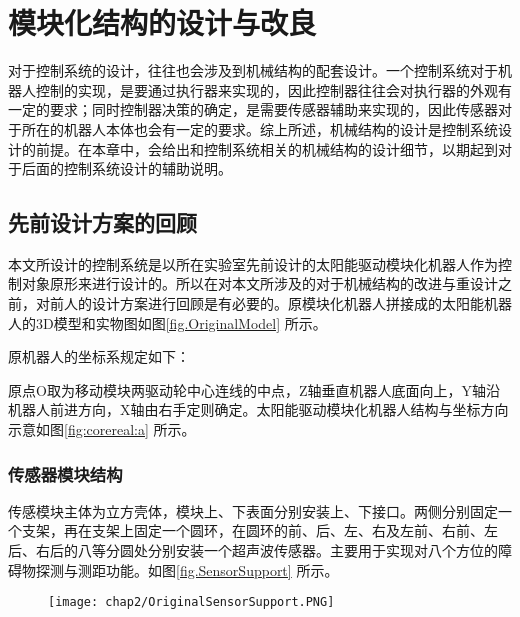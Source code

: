 
\chapter{模块化结构的设计与改良}
\label{chap:mechanicalSystem}
对于控制系统的设计，往往也会涉及到机械结构的配套设计。一个控制系统对于机器人控制的实现，是要通过执行器来实现的，因此控制器往往会对执行器的外观有一定的要求；同时控制器决策的确定，是需要传感器辅助来实现的，因此传感器对于所在的机器人本体也会有一定的要求。综上所述，机械结构的设计是控制系统设计的前提。在本章中，会给出和控制系统相关的机械结构的设计细节，以期起到对于后面的控制系统设计的辅助说明。

\section{先前设计方案的回顾}
本文所设计的控制系统是以所在实验室先前设计的太阳能驱动模块化机器人作为控制对象原形来进行设计的。所以在对本文所涉及的对于机械结构的改进与重设计之前，对前人的设计方案进行回顾是有必要的。原模块化机器人拼接成的太阳能机器人的3D模型和实物图如图\ref{fig.OriginalModel} 所示。 \\
\begin{figure}
  \centering
  \hspace{1in}
\end{figure}
原机器人的坐标系规定如下：

原点O取为移动模块两驱动轮中心连线的中点，Z轴垂直机器人底面向上，Y轴沿机器人前进方向，X轴由右手定则确定。太阳能驱动模块化机器人结构与坐标方向示意如图\ref{fig:corereal:a} 所示。
\subsection{传感器模块结构}
传感模块主体为立方壳体，模块上、下表面分别安装上、下接口。两侧分别固定一个支架，再在支架上固定一个圆环，在圆环的前、后、左、右及左前、右前、左后、右后的八等分圆处分别安装一个超声波传感器。主要用于实现对八个方位的障碍物探测与测距功能。如图\ref{fig.SensorSupport} 所示。
\begin{figure}[!htp]
  \centering
  \texttt{[image: chap2/OriginalSensorSupport.PNG]}
\end{figure}
